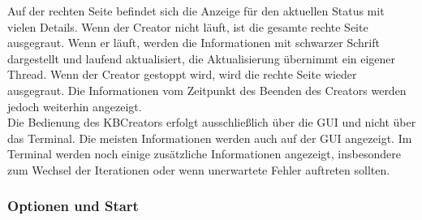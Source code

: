 \documentclass[12pt,a4paper]{article}
\begin{document}
Auf der rechten Seite befindet sich die Anzeige für den aktuellen Status mit vielen Details. Wenn der Creator nicht läuft, ist die gesamte rechte Seite ausgegraut. Wenn er läuft, werden die Informationen mit schwarzer Schrift dargestellt und laufend aktualisiert, die Aktualisierung übernimmt ein eigener Thread. Wenn der Creator gestoppt wird, wird die rechte Seite wieder ausgegraut. Die Informationen vom Zeitpunkt des Beenden des Creators werden jedoch weiterhin angezeigt. \\
Die Bedienung des KBCreators erfolgt ausschließlich über die GUI und nicht über das Terminal. Die meisten Informationen werden auch auf der GUI angezeigt. Im Terminal werden noch einige zusätzliche Informationen angezeigt, insbesondere zum Wechsel der Iterationen oder wenn unerwartete Fehler auftreten sollten.


\subsubsection{Optionen und Start}
\end{document}
